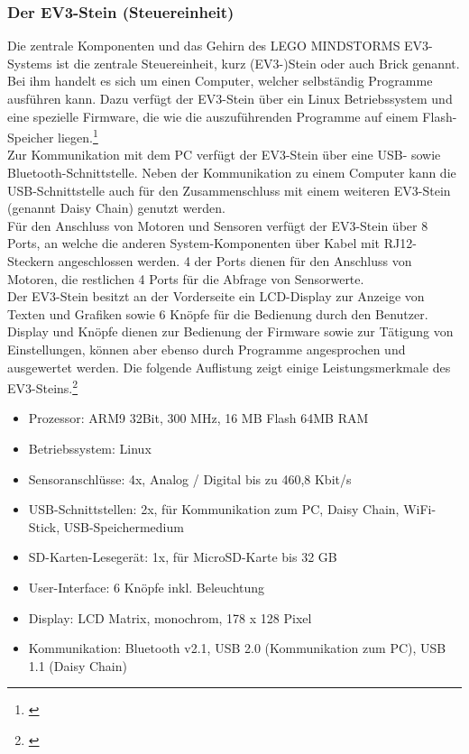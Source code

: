 \subsubsection{Der EV3-Stein (Steuereinheit)}
Die zentrale Komponenten und das Gehirn des LEGO MINDSTORMS EV3-Systems ist die zentrale Steuereinheit, kurz (EV3-)Stein oder auch Brick genannt. Bei ihm handelt es sich um einen Computer, welcher selbständig Programme ausführen kann. Dazu verfügt der EV3-Stein über ein Linux Betriebssystem und eine spezielle Firmware, die wie die auszuführenden Programme auf einem Flash-Speicher liegen.\footnote{\citep[vgl.][Das EV3 Roboter Universum, Seite 21]{Scholz.DasEV3}\label{note25}} \\
Zur Kommunikation mit dem PC verfügt der EV3-Stein über eine USB- sowie Bluetooth-Schnittstelle. Neben der Kommunikation zu einem Computer kann die USB-Schnittstelle auch für den Zusammenschluss mit einem weiteren EV3-Stein (genannt Daisy Chain) genutzt werden.  \\
Für den Anschluss von Motoren und Sensoren verfügt der EV3-Stein über 8 Ports, an welche die anderen System-Komponenten über Kabel mit RJ12-Steckern angeschlossen werden. 4 der Ports dienen für den Anschluss von
Motoren, die restlichen 4 Ports für die Abfrage von Sensorwerte. \\
Der EV3-Stein besitzt an der Vorderseite ein LCD-Display zur Anzeige von Texten und Grafiken sowie 6 Knöpfe für die Bedienung durch den Benutzer. Display und Knöpfe dienen zur Bedienung der Firmware sowie zur Tätigung von Einstellungen, können aber ebenso durch Programme angesprochen und ausgewertet werden.
\medskip
\newline
Die folgende Auflistung zeigt einige Leistungsmerkmale des EV3-Steins.\footnote{\citep[vgl.][Das EV3 Roboter Universum, Seite 23 f., EV3-Programmieren mit Java, Seite 32]{Scholz.DasEV3, Schobel.RobertaEV3Programmieren}\label{note26}}
\begin{itemize}
	\item{Prozessor:} ARM9 32Bit, 300 MHz, 16 MB Flash 64MB RAM
	\item{Betriebssystem:} Linux
	\item{Sensoranschlüsse:} 4x, Analog / Digital bis zu 460,8 Kbit/s
	\item{USB-Schnittstellen:} 2x, für Kommunikation zum PC, Daisy Chain, WiFi-Stick, USB-Speichermedium
	\item{SD-Karten-Lesegerät:} 1x, für MicroSD-Karte bis 32 GB
	\item{User-Interface:} 6 Knöpfe inkl. Beleuchtung
	\item{Display:} LCD Matrix, monochrom, 178 x 128 Pixel
	\item{Kommunikation:} Bluetooth v2.1, USB 2.0 (Kommunikation zum PC), USB 1.1 (Daisy Chain)
\end{itemize}
